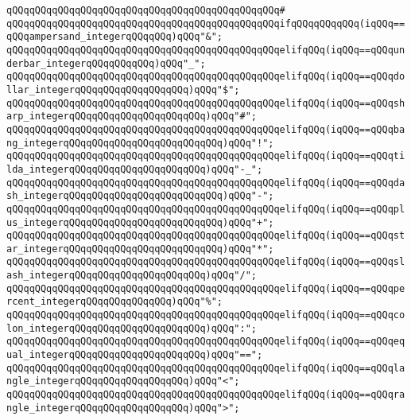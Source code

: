 \verb|qQQqqQQqqQQqqQQqqQQqqQQqqQQqqQQqqQQqqQQqqQQqqQQq#|\newline
\verb|qQQqqQQqqQQqqQQqqQQqqQQqqQQqqQQqqQQqqQQqqQQqqQQqifqQQqqQQqqQQq(iqQQq==qQQqampersand_integerqQQqqQQq)qQQq"&";|\newline
\verb|qQQqqQQqqQQqqQQqqQQqqQQqqQQqqQQqqQQqqQQqqQQqqQQqelifqQQq(iqQQq==qQQqunderbar_integerqQQqqQQqqQQq)qQQq"_";|\newline
\verb|qQQqqQQqqQQqqQQqqQQqqQQqqQQqqQQqqQQqqQQqqQQqqQQqelifqQQq(iqQQq==qQQqdollar_integerqQQqqQQqqQQqqQQqqQQq)qQQq"$";|\newline
\verb|qQQqqQQqqQQqqQQqqQQqqQQqqQQqqQQqqQQqqQQqqQQqqQQqelifqQQq(iqQQq==qQQqsharp_integerqQQqqQQqqQQqqQQqqQQqqQQq)qQQq"#";|\newline
\verb|qQQqqQQqqQQqqQQqqQQqqQQqqQQqqQQqqQQqqQQqqQQqqQQqelifqQQq(iqQQq==qQQqbang_integerqQQqqQQqqQQqqQQqqQQqqQQqqQQq)qQQq"!";|\newline
\verb|qQQqqQQqqQQqqQQqqQQqqQQqqQQqqQQqqQQqqQQqqQQqqQQqelifqQQq(iqQQq==qQQqtilda_integerqQQqqQQqqQQqqQQqqQQqqQQq)qQQq"-_";|\newline
\verb|qQQqqQQqqQQqqQQqqQQqqQQqqQQqqQQqqQQqqQQqqQQqqQQqelifqQQq(iqQQq==qQQqdash_integerqQQqqQQqqQQqqQQqqQQqqQQqqQQq)qQQq"-";|\newline
\verb|qQQqqQQqqQQqqQQqqQQqqQQqqQQqqQQqqQQqqQQqqQQqqQQqelifqQQq(iqQQq==qQQqplus_integerqQQqqQQqqQQqqQQqqQQqqQQqqQQq)qQQq"+";|\newline
\verb|qQQqqQQqqQQqqQQqqQQqqQQqqQQqqQQqqQQqqQQqqQQqqQQqelifqQQq(iqQQq==qQQqstar_integerqQQqqQQqqQQqqQQqqQQqqQQqqQQq)qQQq"*";|\newline
\verb|qQQqqQQqqQQqqQQqqQQqqQQqqQQqqQQqqQQqqQQqqQQqqQQqelifqQQq(iqQQq==qQQqslash_integerqQQqqQQqqQQqqQQqqQQqqQQq)qQQq"/";|\newline
\verb|qQQqqQQqqQQqqQQqqQQqqQQqqQQqqQQqqQQqqQQqqQQqqQQqelifqQQq(iqQQq==qQQqpercent_integerqQQqqQQqqQQqqQQq)qQQq"%";|\newline
\verb|qQQqqQQqqQQqqQQqqQQqqQQqqQQqqQQqqQQqqQQqqQQqqQQqelifqQQq(iqQQq==qQQqcolon_integerqQQqqQQqqQQqqQQqqQQqqQQq)qQQq":";|\newline
\verb|qQQqqQQqqQQqqQQqqQQqqQQqqQQqqQQqqQQqqQQqqQQqqQQqelifqQQq(iqQQq==qQQqequal_integerqQQqqQQqqQQqqQQqqQQqqQQq)qQQq"==";|\newline
\verb|qQQqqQQqqQQqqQQqqQQqqQQqqQQqqQQqqQQqqQQqqQQqqQQqelifqQQq(iqQQq==qQQqlangle_integerqQQqqQQqqQQqqQQqqQQq)qQQq"<";|\newline
\verb|qQQqqQQqqQQqqQQqqQQqqQQqqQQqqQQqqQQqqQQqqQQqqQQqelifqQQq(iqQQq==qQQqrangle_integerqQQqqQQqqQQqqQQqqQQq)qQQq">";|\newline
